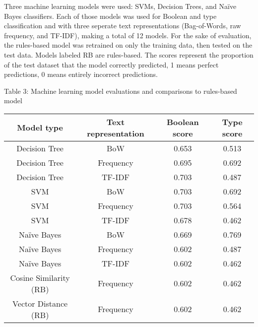 \documentclass{article}
\begin{document}
Three machine learning models were used: SVMs, Decision Trees, and Naïve Bayes classifiers. Each of those models was used for Boolean and type classification and with three seperate text representations (Bag-of-Words, raw frequency, and TF-IDF), making a total of 12 models. For the sake of evaluation, the rules-based model was retrained on only the training data, then tested on the test data. Models labeled RB are rules-based. The scores represent the proportion of the test dataset that the model correctly predicted, 1 means perfect predictions, 0 means entirely incorrect predictions.
\begin{center}
Table 3: Machine learning model evaluations and comparisons to rules-based model
\begin{tabular}{ |c|c|c|c| }
\hline {\bf Model type} & {\bf Text representation} & {\bf Boolean score} & {\bf Type score} \\
\hline Decision Tree & BoW & 0.653 &  0.513\\
\hline Decision Tree & Frequency & 0.695  &  0.692\\
\hline Decision Tree & TF-IDF & 0.703 & 0.487\\
\hline SVM & BoW & 0.703 & 0.692\\
\hline SVM & Frequency & 0.703 & 0.564\\
\hline SVM & TF-IDF & 0.678 & 0.462\\
\hline Naïve Bayes & BoW & 0.669 & 0.769\\
\hline Naïve Bayes & Frequency & 0.602 & 0.487\\
\hline Naïve Bayes & TF-IDF & 0.602 & 0.462\\
\hline Cosine Similarity (RB) & Frequency & 0.602 & 0.462\\
\hline Vector Distance (RB) & Frequency & 0.602 & 0.462\\
\hline
\end{tabular}
\end{center}
\end{document}
